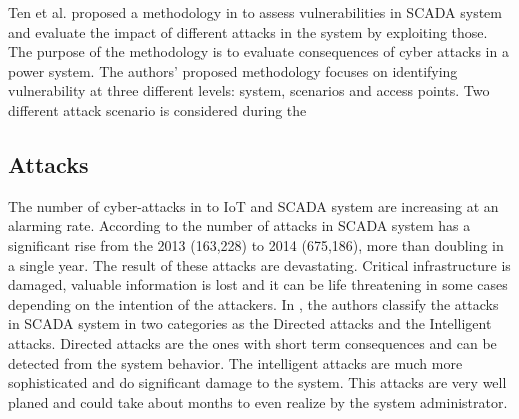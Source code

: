 \documentclass[letterpaper, 10 pt, conference]{ieeeconf}  %
\begin{document}
Ten et al. proposed a methodology in \cite{c12} to assess vulnerabilities in SCADA system and evaluate the impact of different attacks in the system by exploiting those. The purpose of the methodology is to evaluate consequences of cyber attacks in a power system. The authors' proposed methodology focuses on identifying vulnerability at three different levels: system, scenarios and access points. Two different attack scenario is considered during the  
\subsection{Attacks}
The number of cyber-attacks in to IoT and SCADA system are increasing at an alarming rate. According to \cite{c11} the number of attacks in SCADA system has a significant rise from the 2013 (163,228) to 2014 (675,186), more than doubling in a single year. The result of these attacks are devastating. Critical infrastructure is damaged, valuable information is lost and it can be life threatening in some cases depending on the intention of the attackers. In \cite{c12}, the authors classify the attacks in SCADA system in two categories as the Directed attacks and the Intelligent attacks. Directed attacks are the ones with short term consequences and can be detected from the system behavior. The intelligent attacks are much more sophisticated and do significant damage to the system. This attacks are very well planed and could take about months to even realize by the system administrator.
\end{document}
